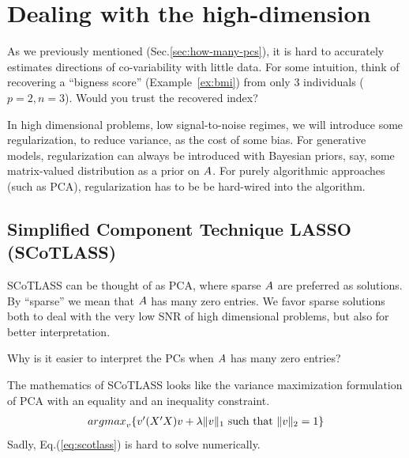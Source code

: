 \documentclass[12pt,a4paper]{article}
\begin{document}
\begin{remark}
\end{remark}











\section{Dealing with the high-dimension}

As we previously mentioned (Sec.\ref{sec:how-many-pcs}), it is hard to accurately estimates directions of co-variability with little data. 
For some intuition, think of recovering a ``bigness score'' (Example~\ref{ex:bmi}) from only 3 individuals ($p=2,n=3$). 
Would you trust the recovered index?

In high dimensional problems, \aka low signal-to-noise regimes, we will introduce some regularization, to reduce variance, as the cost of some bias. 
For generative models, regularization can always be introduced with Bayesian priors, say, some matrix-valued distribution as a prior on $A$. 
For purely algorithmic approaches (such as PCA), regularization has to be be hard-wired into the algorithm.



\subsection{Simplified Component Technique LASSO (SCoTLASS)}

SCoTLASS can be thought of as PCA, where sparse $A$ are preferred as solutions.
By ``sparse'' we mean that $A$ has many zero entries. 
We favor sparse solutions both to deal with the very low SNR of high dimensional problems, but also for better interpretation.

\begin{think}
	Why is it easier to interpret the PCs when $A$ has many zero entries?
\end{think}

The mathematics of SCoTLASS looks like the variance maximization formulation of PCA with an equality and an inequality constraint.
\begin{align}
\label{eq:scotlass}
	\textstyle{\mathop{argmax}_{v}}\{ v'(X'X)v  + \lambda \Vert v \Vert_1 \text{ such that } \Vert v \Vert_2=1  \}
\end{align}
Sadly, Eq.(\ref{eq:scotlass}) is hard to solve numerically.
\end{document}
